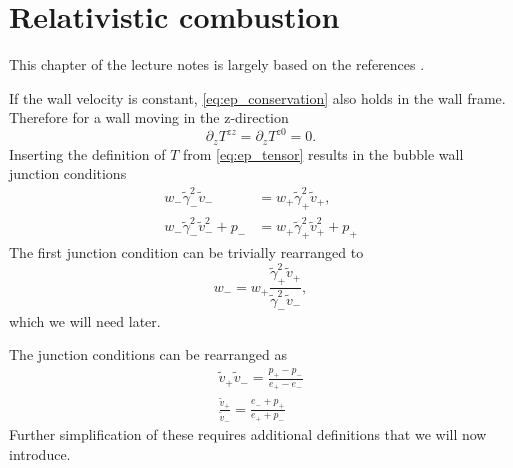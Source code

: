 \section{Relativistic combustion}
This chapter of the lecture notes is largely based on the references
\cites{hindmarsh_gw_pt_2019}{espinosa_energy_2010}.

If the wall velocity is constant, \eqref{eq:ep_conservation} also holds in the wall frame.
Therefore for a wall moving in the z-direction
\cite[eq. 7]{espinosa_energy_2010}
\begin{equation}
\partial_z T^{zz} = \partial_z T^{z0} = 0.
\end{equation}
Inserting the definition of $T$ from \eqref{eq:ep_tensor} results in the bubble wall junction conditions
\cites[eq. 7.22]{lecture_notes}[eq. B.2-3]{hindmarsh_gw_pt_2019}
\begin{align}
w_- \tilde{\gamma}_-^2 \tilde{v}_- &= w_+ \tilde{\gamma}_+^2 \tilde{v}_+,
\label{eq:junction_condition_1} \\
w_- \tilde{\gamma}_-^2 \tilde{v}_-^2 + p_- &= w_+ \tilde{\gamma}_+^2 \tilde{v}_+^2 + p_+
\label{eq:junction_condition_2}
\end{align}
The first junction condition can be trivially rearranged to
\begin{equation}
w_- = w_+ \frac{\tilde{\gamma}_+^2 \tilde{v}_+}{\tilde{\gamma}_-^2 \tilde{v}_-},
\label{eq:wm_junction}
\end{equation}
which we will need later.

The junction conditions can be rearranged as
\cites[eq. 7.32]{lecture_notes}[eq. 6-7]{giese_2020}
\begin{align}
\tilde{v}_+ \tilde{v}_- = \frac{p_+ - p_-}{e_+ - e_-} \\
\frac{\tilde{v}_+}{\tilde{v}_-} = \frac{e_- + p_+}{e_+ + p_-}
\label{eq:junction_ep}
\end{align}
Further simplification of these requires additional definitions
that we will now introduce.

